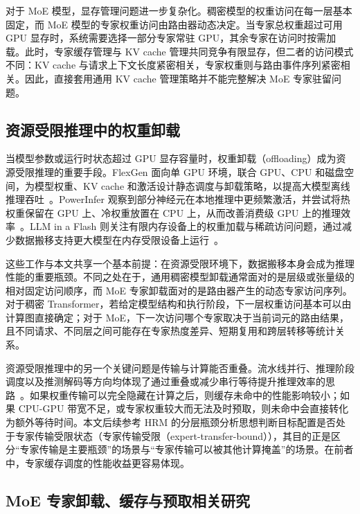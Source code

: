 对于 MoE 模型，显存管理问题进一步复杂化。稠密模型的权重访问在每一层基本固定，而 MoE 模型的专家权重访问由路由器动态决定。当专家总权重超过可用 GPU 显存时，系统需要选择一部分专家常驻 GPU，其余专家在访问时按需加载。此时，专家缓存管理与 KV cache 管理共同竞争有限显存，但二者的访问模式不同：KV cache 与请求上下文长度紧密相关，专家权重则与路由事件序列紧密相关。因此，直接套用通用 KV cache 管理策略并不能完整解决 MoE 专家驻留问题。

\subsection{资源受限推理中的权重卸载}

当模型参数或运行时状态超过 GPU 显存容量时，权重卸载（offloading）成为资源受限推理的重要手段。FlexGen 面向单 GPU 环境，联合 GPU、CPU 和磁盘空间，为模型权重、KV cache 和激活设计静态调度与卸载策略，以提高大模型离线推理吞吐~\cite{sheng2023flexgen}。PowerInfer 观察到部分神经元在本地推理中更频繁激活，并尝试将热权重保留在 GPU 上、冷权重放置在 CPU 上，从而改善消费级 GPU 上的推理效率~\cite{song2023powerinfer}。LLM in a Flash 则关注有限内存设备上的权重加载与稀疏访问问题，通过减少数据搬移支持更大模型在内存受限设备上运行~\cite{alizadeh2024llminflash}。

这些工作与本文共享一个基本前提：在资源受限环境下，数据搬移本身会成为推理性能的重要瓶颈。不同之处在于，通用稠密模型卸载通常面对的是层级或张量级的相对固定访问顺序，而 MoE 专家卸载面对的是路由器产生的动态专家访问序列。对于稠密 Transformer，若给定模型结构和执行阶段，下一层权重访问基本可以由计算图直接确定；对于 MoE，下一次访问哪个专家取决于当前词元的路由结果，且不同请求、不同层之间可能存在专家热度差异、短期复用和跨层转移等统计关系。

资源受限推理中的另一个关键问题是传输与计算能否重叠。流水线并行、推理阶段调度以及推测解码等方向均体现了通过重叠或减少串行等待提升推理效率的思路~\cite{huang2019gpipe,narayanan2019pipedream,leviathan2023speculative}。如果权重传输可以完全隐藏在计算之后，则缓存未命中的性能影响较小；如果 CPU-GPU 带宽不足，或专家权重较大而无法及时预取，则未命中会直接转化为额外等待时间。本文后续参考 HRM 的分层瓶颈分析思想判断目标配置是否处于专家传输受限状态（专家传输受限（expert-transfer-bound）），其目的正是区分“专家传输是主要瓶颈”的场景与“专家传输可以被其他计算掩盖”的场景。在前者中，专家缓存调度的性能收益更容易体现。

\subsection{MoE 专家卸载、缓存与预取相关研究}

